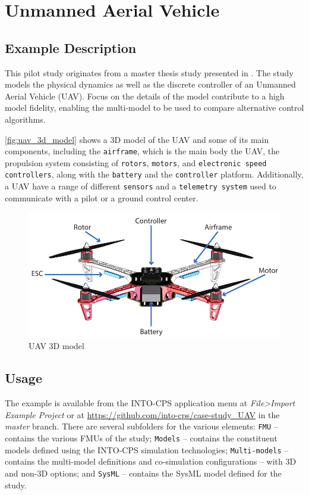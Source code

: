 \section{Unmanned Aerial Vehicle}
\label{sec:uavsingle}

	\subsection{Example Description}
	\label{sec:uavsingle_desc}
		This pilot study originates from a master thesis study presented in \cite{Grujic&16}.
		The study models the physical dynamics as well as the discrete controller of an Unmanned Aerial Vehicle (UAV).
		Focus on the details of the model contribute to a high model fidelity, enabling the multi-model to be used to compare alternative control algorithms.

		\autoref{fig:uav_3d_model} shows a 3D model of the UAV and some of its main components, including the \texttt{airframe}, which is the main body the UAV, the propulsion system consisting of \texttt{rotors}, \texttt{motors}, and \texttt{electronic speed controllers}, along with the \texttt{battery} and the \texttt{controller} platform.
		Additionally, a UAV have a range of different \texttt{sensors} and a \texttt{telemetry system} used to communicate with a pilot or a ground control center.

		\begin{figure}[htbp]
			\centering
			\includegraphics[width=0.7\linewidth]{uavsingle/drone.pdf}
			\caption{UAV 3D model}
			\label{fig:uav_3d_model}
		\end{figure}

	\subsection{Usage}
	\label{sec:uavsingle_usage}
		The example is available from the INTO-CPS application menu at \emph{File>Import Example Project} or at  \url{https://github.com/into-cps/case-study\_UAV} in the \emph{master} branch. There are several subfolders for the various elements: \texttt{FMU} -- contains the various FMUs of the study; \texttt{Models} -- contains the constituent models defined using the INTO-CPS simulation technologies; \texttt{Multi-models} -- contains the multi-model definitions and co-simulation configurations -- with 3D and non-3D options; and \texttt{SysML} -- contains the SysML model defined for the study.

